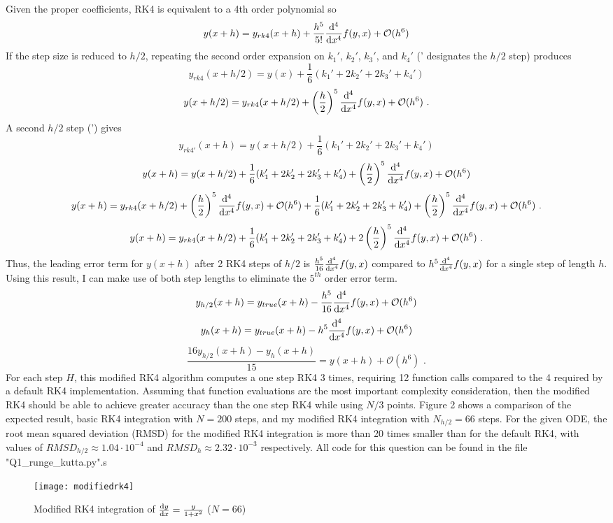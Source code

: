 \documentclass{article}
\newcommand{\<}[1]{\left\langle #1 \right\rangle }
\begin{document}
Given the proper coefficients, RK4 is equivalent to a 4th order polynomial so
\[y(x+h) = y_{rk4}(x+h) + \frac{h^5}{5!}\dv[4]{}{x}f(y,x) + \mathcal{O}(h^6)\]
If the step size is reduced to $h/2$, repeating the second order expansion on $k_1'$, $k_2'$, $k_3'$, and $k_4'$ (' designates the $h/2$ step) produces
\[y_{rk4}(x+h/2) = y(x) + \frac{1}{6} (k_1' + 2k_2' + 2k_3' + k_4')\]
\[y(x+h/2) = y_{rk4}(x+h/2) + \left(\frac{h}{2}\right)^5 \dv[4]{}{x}f(y,x) + \mathcal{O}(h^6) \text{ .}\]
A second $h/2$ step (') gives
\[y_{rk4'}(x+h) = y(x+h/2) + \frac{1}{6} (k_1' + 2k_2' + 2k_3' + k_4')\]
\[y(x+h) = y(x+h/2) + \frac{1}{6} (k_1' + 2k_2' + 2k_3' + k_4') + \left(\frac{h}{2}\right)^5 \dv[4]{}{x}f(y,x) + \mathcal{O}(h^6) \]
\[y(x+h) = y_{rk4}(x+h/2) + \left(\frac{h}{2}\right)^5 \dv[4]{}{x}f(y,x) + \mathcal{O}(h^6) + \frac{1}{6} (k_1' + 2k_2' + 2k_3' + k_4') + \left(\frac{h}{2}\right)^5 \dv[4]{}{x}f(y,x) + \mathcal{O}(h^6) \text{ .} \]
\[y(x+h) = y_{rk4}(x+h/2) + \frac{1}{6} (k_1' + 2k_2' + 2k_3' + k_4') + 2\left(\frac{h}{2}\right)^5 \dv[4]{}{x}f(y,x) + \mathcal{O}(h^6) \text{ .} \]
Thus, the leading error term for $y(x+h)$ after 2 RK4 steps of $h/2$ is $\frac{h^5}{16}\dv[4]{}{x}f(y,x)$ compared to $h^5\dv[4]{}{x}f(y,x)$ for a single step of length $h$. Using this result, I can make use of both step lengths to eliminate the $5^{th}$ order error term.
\[y_{h/2}(x+h) = y_{true}(x+h) - \frac{h^5}{16}\dv[4]{}{x}f(y,x) + \mathcal{O}(h^6)\]
\[y_{h}(x+h) = y_{true}(x+h) - h^5\dv[4]{}{x}f(y,x) + \mathcal{O}(h^6)\]
\[ \boxed{ \frac{16y_{h/2}(x+h) - y_h(x+h)}{15} = y(x+h) + \mathcal{O}(h^6) } \text{ .}\]
For each step $H$, this modified RK4 algorithm computes a one step RK4 3 times, requiring 12 function calls compared to the 4 required by a default RK4 implementation. Assuming that function evaluations are the most important complexity consideration, then the modified RK4 should be able to achieve greater accuracy than the one step RK4 while using $N/3$ points. Figure 2 shows a comparison of the expected result, basic RK4 integration with $N=200$ steps, and my modified RK4 integration with $N_{h/2} = 66$ steps. For the given ODE, the root mean squared deviation (RMSD) for the modified RK4 integration is more than 20 times smaller than for the default RK4, with values of $RMSD_{h/2}\approx 1.04 \cdot 10^{-4}$ and $ RMSD_h \approx 2.32 \cdot 10^{-3}$ respectively. All code for this question can be found in the file "Q1\_runge\_kutta.py".s
\begin{figure}[h]
	\caption{Modified RK4 integration of $\dv{y}{x} = \frac{y}{1+x^2}$ ($N=66$)}
	\centering
	\texttt{[image: modifiedrk4]}
\end{figure}
\end{document}
